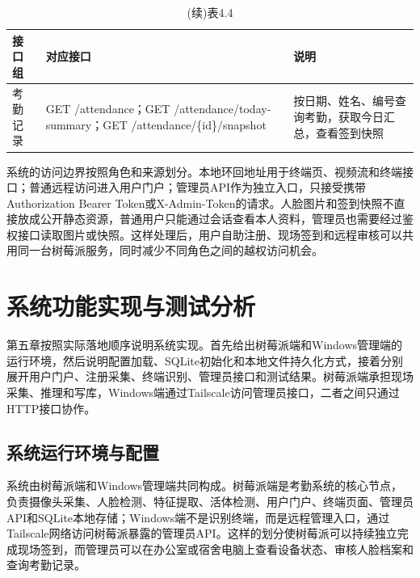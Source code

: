 \documentclass[UTF8]{heuthesis}
\begin{document}
\begingroup
\small
\begin{longtable}{|>{\raggedright\arraybackslash}p{}|>{\raggedright\arraybackslash}p{}|>{\raggedright\arraybackslash}p{}|}
\caption{(续)表4.4}\\
\hline
接口组 & 对应接口 & 说明 \\
\hline
考勤记录 & GET /attendance；GET /attendance/today-summary；GET /attendance/\{id\}/snapshot & 按日期、姓名、编号查询考勤，获取今日汇总，查看签到快照 \\
\hline
\end{longtable}
\endgroup

系统的访问边界按照角色和来源划分。本地环回地址用于终端页、视频流和终端接口；普通远程访问进入用户门户；管理员API作为独立入口，只接受携带Authorization Bearer Token或X-Admin-Token的请求。人脸图片和签到快照不直接放成公开静态资源，普通用户只能通过会话查看本人资料，管理员也需要经过鉴权接口读取图片或快照。这样处理后，用户自助注册、现场签到和远程审核可以共用同一台树莓派服务，同时减少不同角色之间的越权访问机会。

\chapter{系统功能实现与测试分析}
第五章按照实际落地顺序说明系统实现。首先给出树莓派端和Windows管理端的运行环境，然后说明配置加载、SQLite初始化和本地文件持久化方式，接着分别展开用户门户、注册采集、终端识别、管理员接口和测试结果。树莓派端承担现场采集、推理和写库，Windows端通过Tailscale访问管理员接口，二者之间只通过HTTP接口协作。

\section{系统运行环境与配置}
系统由树莓派端和Windows管理端共同构成。树莓派端是考勤系统的核心节点，负责摄像头采集、人脸检测、特征提取、活体检测、用户门户、终端页面、管理员API和SQLite本地存储；Windows端不是识别终端，而是远程管理入口，通过Tailscale网络访问树莓派暴露的管理员API。这样的划分使树莓派可以持续独立完成现场签到，而管理员可以在办公室或宿舍电脑上查看设备状态、审核人脸档案和查询考勤记录。
\end{document}

